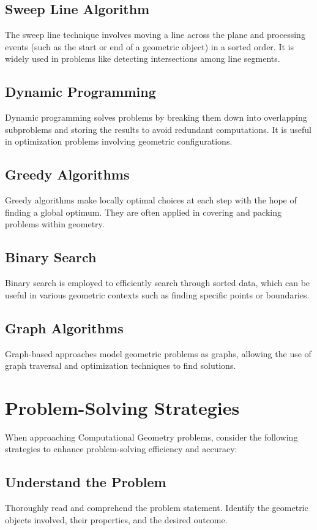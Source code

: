 \subsection{Sweep Line Algorithm}
The sweep line technique involves moving a line across the plane and processing events (such as the start or end of a geometric object) in a sorted order. It is widely used in problems like detecting intersections among line segments.

\subsection{Dynamic Programming}
Dynamic programming solves problems by breaking them down into overlapping subproblems and storing the results to avoid redundant computations. It is useful in optimization problems involving geometric configurations.

\subsection{Greedy Algorithms}
Greedy algorithms make locally optimal choices at each step with the hope of finding a global optimum. They are often applied in covering and packing problems within geometry.

\subsection{Binary Search}
Binary search is employed to efficiently search through sorted data, which can be useful in various geometric contexts such as finding specific points or boundaries.

\subsection{Graph Algorithms}
Graph-based approaches model geometric problems as graphs, allowing the use of graph traversal and optimization techniques to find solutions.

\section{Problem-Solving Strategies}
When approaching Computational Geometry problems, consider the following strategies to enhance problem-solving efficiency and accuracy:

\subsection{Understand the Problem}
Thoroughly read and comprehend the problem statement. Identify the geometric objects involved, their properties, and the desired outcome.

